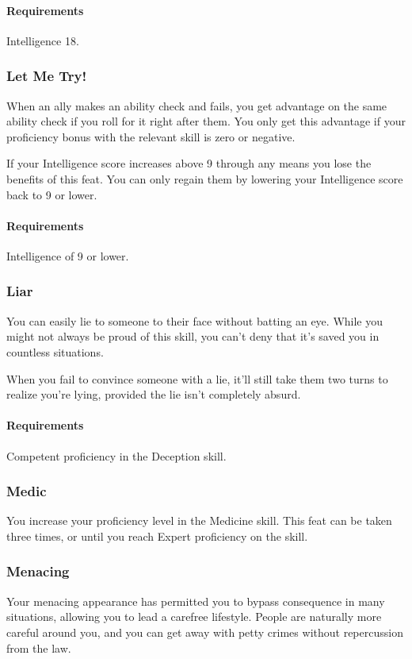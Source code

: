     \paragraph{Requirements} Intelligence 18.
\subsubsection{Let Me Try!} \label{feat::letmetry}
    When an ally makes an ability check and fails, you get advantage on the same ability check if you roll for it right after them.
    You only get this advantage if your proficiency bonus with the relevant skill is zero or negative.

    If your Intelligence score increases above 9 through any means you lose the benefits of this feat.
    You can only regain them by lowering your Intelligence score back to 9 or lower.
    \paragraph{Requirements} Intelligence of 9 or lower.
\subsubsection{Liar} \label{feat::liar}
    You can easily lie to someone to their face without batting an eye.
    While you might not always be proud of this skill, you can't deny that it's saved you in countless situations.

    When you fail to convince someone with a lie, it'll still take them two turns to realize you're lying, provided the lie isn't completely absurd.
    \paragraph{Requirements} Competent proficiency in the Deception skill.
\subsubsection{Medic} \label{feat::medic}
    You increase your proficiency level in the Medicine skill.
    This feat can be taken three times, or until you reach Expert proficiency on the skill.
\subsubsection{Menacing} \label{feat::menacing}
    Your menacing appearance has permitted you to bypass consequence in many situations, allowing you to lead a carefree lifestyle.
    People are naturally more careful around you, and you can get away with petty crimes without repercussion from the law.
